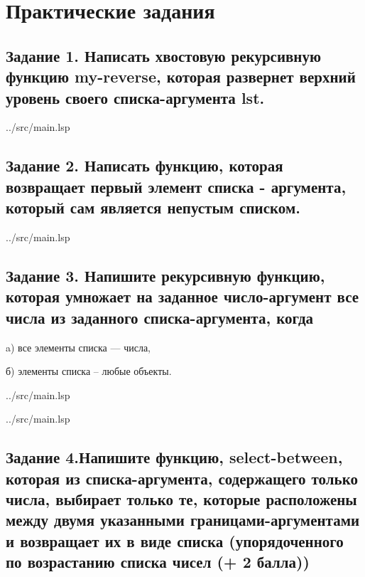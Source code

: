 \chapter{Практические задания}

\section*{Задание 1. Написать хвостовую рекурсивную функцию my-reverse, которая развернет верхний уровень своего списка-аргумента lst.}

\begin{lstinputlisting}[
	caption={Задание 1},
	label={lst:t1},
	style={lsp},
	linerange={1-6},
	]{../src/main.lsp}
\end{lstinputlisting}

\section*{Задание 2.  Написать функцию, которая возвращает первый элемент списка - аргумента, который сам является непустым списком.}

\begin{lstinputlisting}[
	caption={Задание 2},
	label={lst:t2},
	style={lsp},
	linerange={8-13},
	]{../src/main.lsp}
\end{lstinputlisting}

\section*{Задание 3.  Напишите рекурсивную функцию, которая умножает на заданное число-аргумент все числа из заданного списка-аргумента, когда}
a) все элементы списка --- числа,

б) элементы списка -- любые объекты.

\begin{lstinputlisting}[
	caption={Задание 3, a},
	label={lst:t3-1},
	style={lsp},
	linerange={24-30},
	]{../src/main.lsp}
\end{lstinputlisting}

\clearpage

\begin{lstinputlisting}[
	caption={Задание 3, b},
	label={lst:t3-2},
	style={lsp},
	linerange={32-37},
	]{../src/main.lsp}
\end{lstinputlisting}


\section*{Задание 4.Напишите функцию, select-between, которая из списка-аргумента, содержащего только числа, выбирает только те, которые расположены между двумя указанными границами-аргументами и возвращает их в виде списка (упорядоченного по возрастанию списка чисел (+ 2 балла))}

